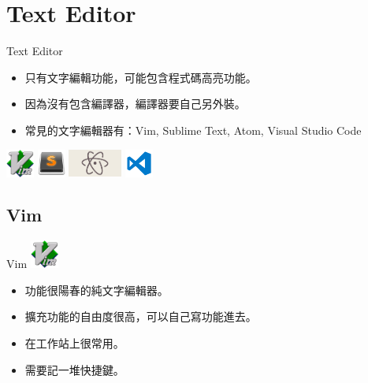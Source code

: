 \documentclass[t]{beamer}
\begin{document}
\section{Text Editor}
\begin{frame}{Text Editor}
  \begin{itemize}
    \item 只有文字編輯功能，可能包含程式碼高亮功能。
    \item 因為沒有包含編譯器，編譯器要自己另外裝。
    \item 常見的文字編輯器有：Vim, Sublime Text, Atom, Visual Studio Code
  \end{itemize}
  \begin{center}
    \includegraphics[height=2.5em]{image/vim.png}
    \hspace{1em}
    \includegraphics[height=2.5em]{image/st.png}
    \hspace{1em}
    \includegraphics[height=2.5em]{image/atom.png}
    \hspace{1em}
    \includegraphics[height=2.5em]{image/vscode.png}
  \end{center}
\end{frame}

\subsection{Vim}
\begin{frame}{Vim}
  \vspace{0.5em}
  \hspace{2em}
  \includegraphics[height=2.5em]{image/vim.png}
  \vspace{0.5em}
  \begin{itemize}
    \item 功能很陽春的純文字編輯器。
    \item 擴充功能的自由度很高，可以自己寫功能進去。
    \item 在工作站上很常用。
    \item 需要記一堆快捷鍵。
  \end{itemize} 
\end{frame}
\end{document}
